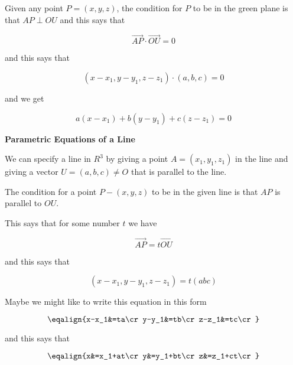\vskip 1mm
Given any point $P=(x,y,z)$, the condition for $P$ to be in the green plane is that $AP\perp OU$ and this says that

$$\vec{AP}\cdot\vec{OU}=0$$

and this says that

$$(x-x_1,y-y_1,z-z_1)\cdot(a,b,c)=0$$

and we get

$$a(x-x_1)+b(y-y_1)+c(z-z_1)=0$$

\filbreak
\vskip 1cm
{\bf Parametric Equations of a Line}

\vskip 1mm
We can specify a line in $R^3$ by giving a point $A=(x_1,y_1,z_1)$ in the line and giving a vector $U=(a,b,c)\neq O$ that is parallel to the line.

\vskip 1mm
The condition for a point $P-(x,y,z)$ to be in the given line is that $AP$ is parallel to $OU$.

This says that for some number $t$ we have

$$\vec{AP}=t\vec{OU}$$

and this says that

$$(x-x_1,y-y_1,z-z_1)=t(abc)$$

Maybe we might like to write this equation in this form

$$\eqalign{x-x_1&=ta\cr
		y-y_1&=tb\cr
		z-z_1&=tc\cr}$$

and this says that

$$\eqalign{x&=x_1+at\cr
		y&=y_1+bt\cr
		z&=z_1+ct\cr}$$

\filbreak
\vfill\eject
\bye
